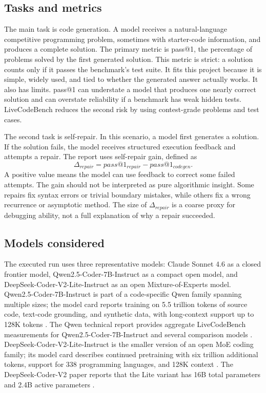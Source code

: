 \documentclass[11pt]{article}
\makeatletter
\newcommand{\lcb}{LiveCodeBench}
\newcommand{\passone}{pass@1}
\makeatother
\begin{document}
\subsection{Tasks and metrics}
The main task is code generation. A model receives a natural-language competitive programming problem, sometimes with starter-code information, and produces a complete solution. The primary metric is \passone{}, the percentage of problems solved by the first generated solution. This metric is strict: a solution counts only if it passes the benchmark's test suite. It fits this project because it is simple, widely used, and tied to whether the generated answer actually works. It also has limits. \passone{} can understate a model that produces one nearly correct solution and can overstate reliability if a benchmark has weak hidden tests. \lcb{} reduces the second risk by using contest-grade problems and test cases.

The second task is self-repair. In this scenario, a model first generates a solution. If the solution fails, the model receives structured execution feedback and attempts a repair. The report uses self-repair gain, defined as
\begin{equation}
\Delta_{repair}=\passone_{repair}-\passone_{codegen}.
\end{equation}
A positive value means the model can use feedback to correct some failed attempts. The gain should not be interpreted as pure algorithmic insight. Some repairs fix syntax errors or trivial boundary mistakes, while others fix a wrong recurrence or asymptotic method. The size of $\Delta_{repair}$ is a coarse proxy for debugging ability, not a full explanation of why a repair succeeded.

\subsection{Models considered}
The executed run uses three representative models: Claude Sonnet 4.6 as a closed frontier model, Qwen2.5-Coder-7B-Instruct as a compact open model, and DeepSeek-Coder-V2-Lite-Instruct as an open Mixture-of-Experts model. Qwen2.5-Coder-7B-Instruct is part of a code-specific Qwen family spanning multiple sizes; the model card reports training on 5.5 trillion tokens of source code, text-code grounding, and synthetic data, with long-context support up to 128K tokens \citep{qwenhf2024}. The Qwen technical report provides aggregate \lcb{} measurements for Qwen2.5-Coder-7B-Instruct and several comparison models \citep{hui2024qwen25coder}. DeepSeek-Coder-V2-Lite-Instruct is the smaller version of an open MoE coding family; its model card describes continued pretraining with six trillion additional tokens, support for 338 programming languages, and 128K context \citep{deepseekhf2024}. The DeepSeek-Coder-V2 paper reports that the Lite variant has 16B total parameters and 2.4B active parameters \citep{zhu2024deepseekcoder}.
\end{document}

